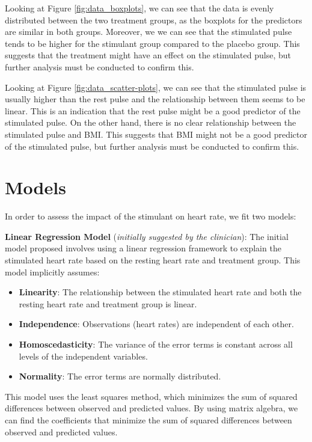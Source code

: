 \documentclass[10pt, a4paper]{article}
\begin{document}
Looking at Figure \ref{fig:data_boxplots}, we can see that the data is evenly distributed between the two treatment groups, as the boxplots for the predictors are similar in both groups. Moreover, we we can see that the stimulated pulse tends to be higher for the stimulant group compared to the placebo group. This suggests that the treatment might have an effect on the stimulated pulse, but further analysis must be conducted to confirm this.

Looking at Figure \ref{fig:data_scatter-plots}, we can see that the stimulated pulse is usually higher than the rest pulse and the relationship between them seems to be linear. This is an indication that the rest pulse might be a good predictor of the stimulated pulse. On the other hand, there is no clear relationship between the stimulated pulse and BMI. This suggests that BMI might not be a good predictor of the stimulated pulse, but further analysis must be conducted to confirm this.

\section{Models}

In order to assess the impact of the stimulant on heart rate, we fit two models:

\textbf{Linear Regression Model} (\textit{initially suggested by the clinician}): The initial model proposed involves using a linear regression framework to explain the stimulated heart rate based on the resting heart rate and treatment group. This model implicitly assumes:
\begin{itemize}
  \item \textbf{Linearity}: The relationship between the stimulated heart rate and both the resting heart rate and treatment group is linear.
  \item \textbf{Independence}: Observations (heart rates) are independent of each other.
  \item \textbf{Homoscedasticity}: The variance of the error terms is constant across all levels of the independent variables.
  \item \textbf{Normality}: The error terms are normally distributed.
\end{itemize}

This model uses the least squares method, which minimizes the sum of squared differences between observed and predicted values. By using matrix algebra, we can find the coefficients that minimize the sum of squared differences between observed and predicted values.
\end{document}
